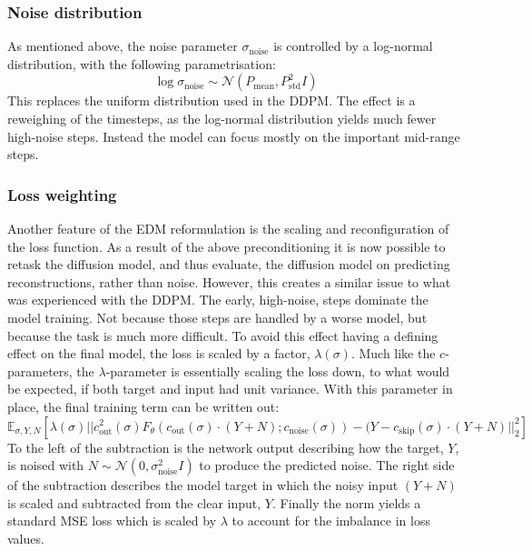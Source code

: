 \subsubsection{Noise distribution}

As mentioned above, the noise parameter $\sigma_{\text{noise}}$ is controlled by a log-normal distribution, with the following parametrisation:
\begin{equation}
    \log \sigma_{\text{noise}} \sim \mathcal{N}(P_{\text{mean}}, P_{\text{std}}^2 I)
\end{equation}
This replaces the uniform distribution used in the DDPM. The effect is a reweighing of the timesteps, as the log-normal distribution yields much fewer high-noise steps. Instead the model can focus mostly on the important mid-range steps. 

\subsubsection{Loss weighting}

Another feature of the EDM reformulation is the scaling and reconfiguration of the loss function. As a result of the above preconditioning it is now possible to retask the diffusion model, and thus evaluate, the diffusion model on predicting reconstructions, rather than noise. However, this creates a similar issue to what was experienced with the DDPM. The early, high-noise, steps dominate the model training. Not because those steps are handled by a worse model, but because the task is much more difficult. To avoid this effect having a defining effect on the final model, the loss is scaled by a factor, $\lambda(\sigma)$. Much like the $c$-parameters, the $\lambda$-parameter is essentially scaling the loss down, to what would be expected, if both target and input had unit variance. With this parameter in place, the final training term can be written out:
\begin{equation}
    \mathbb{E}_{\sigma, Y, N} \left[ \lambda(\sigma) || c_{\text{out}}^2(\sigma) F_{\theta}(c_{\text{out}}(\sigma) \cdot (Y + N); c_{\text{noise}}(\sigma)) - 
        (Y - c_{\text{skip}}(\sigma) \cdot (Y + N) ||_2^2 \right]
\end{equation}
To the left of the subtraction is the network output describing how the target, $Y$, is noised with $N \sim \mathcal{N}(0, \sigma_{\text{noise}}^2 I)$ to produce the predicted noise. The right side of the subtraction describes the model target in which the noisy input $(Y+N)$ is scaled and subtracted from the clear input, $Y$. Finally the norm yields a standard MSE loss which is scaled by $\lambda$ to account for the imbalance in loss values.

